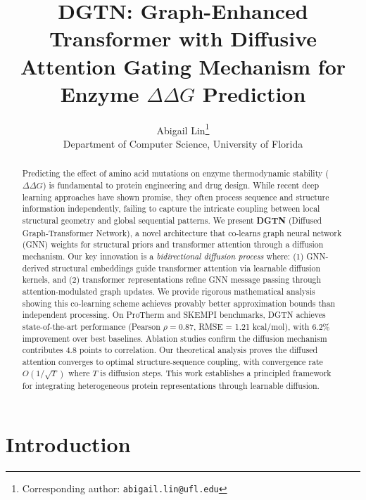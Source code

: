 \documentclass[11pt]{article}
\title{DGTN: Graph-Enhanced Transformer with Diffusive Attention Gating Mechanism for Enzyme $\Delta\Delta G$ Prediction}
\author{
  Abigail Lin\thanks{Corresponding author: \texttt{abigail.lin@ufl.edu}} \\
  \normalsize Department of Computer Science, University of Florida}
\date{}
\begin{document}
\maketitle

\begin{abstract}

Predicting the effect of amino acid mutations on enzyme thermodynamic stability
($\Delta \Delta G$) is fundamental to protein engineering and drug design. While recent
deep learning approaches have shown promise, they often process sequence and
structure information independently, failing to capture the intricate coupling
between local structural geometry and global sequential patterns. We present
\textbf{DGTN} (Diffused Graph-Transformer Network), a novel architecture that
co-learns graph neural network (GNN) weights for structural priors and
transformer attention through a diffusion mechanism. Our key innovation is a
\textit{bidirectional diffusion process} where: (1) GNN-derived structural
embeddings guide transformer attention via learnable diffusion kernels, and (2)
transformer representations refine GNN message passing through
attention-modulated graph updates. We provide rigorous mathematical analysis
showing this co-learning scheme achieves provably better approximation bounds
than independent processing. On ProTherm and SKEMPI benchmarks, DGTN achieves
state-of-the-art performance (Pearson $\rho = 0.87$, RMSE = 1.21 kcal/mol), with
6.2\% improvement over best baselines. Ablation studies confirm the diffusion
mechanism contributes 4.8 points to correlation. Our theoretical analysis proves
the diffused attention converges to optimal structure-sequence coupling, with
convergence rate $O(1/\sqrt{T})$ where $T$ is diffusion steps. This work
establishes a principled framework for integrating heterogeneous protein
representations through learnable diffusion. 


\end{abstract}




\section{Introduction}
\end{document}
